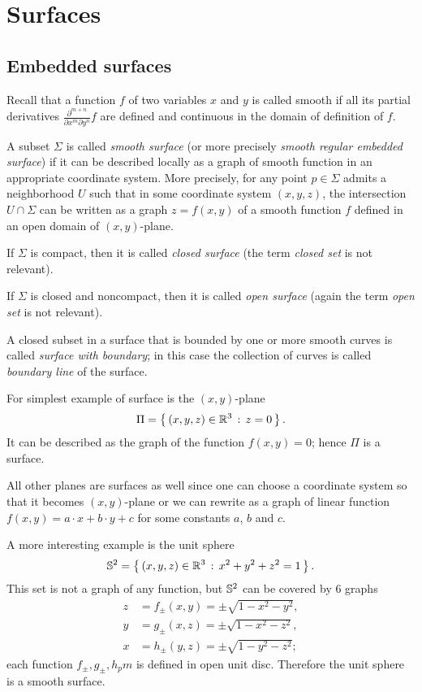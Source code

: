 \chapter{Surfaces}

\section{Embedded surfaces}

Recall that a function $f$ of two variables $x$ and $y$ is called smooth if all its partial derivatives $\frac{\partial^{m+n}}{\partial x^m\partial y^n}f$ are defined and continuous in the domain of definition of $f$. 

A subset $\Sigma$ is called \emph{smooth surface} (or more precisely \emph{smooth regular embedded surface}) if it can be described locally as a graph of smooth function in an appropriate coordinate system.
More precisely, for any point $p\in \Sigma$ admits a neighborhood $U$ such that
in some coordinate system $(x,y,z)$, 
the intersection $U\cap \Sigma$ can be written as a graph $z=f(x,y)$ of a smooth function $f$ defined in an open domain of $(x,y)$-plane.

If $\Sigma$ is compact, then it is called \emph{closed surface} (the term \emph{closed set} is not relevant).

If $\Sigma$ is closed and noncompact, then it is called  \emph{open surface} (again the term \emph{open set} is not relevant).

A closed subset in a surface that is bounded by one or more smooth curves is called \emph{surface with boundary}; in this case the collection of curves is called \emph{boundary line} of the surface.

For simplest example of surface is the $(x,y)$-plane 
\[\Pi=\left\{\,{(x,y,z)\in\mathbb{R}^3}\,:\,{z=0}\,\right\}.\]
It can be described as the graph of the function $f(x,y)=0$; hence $\Pi$ is a surface.

All other planes are surfaces as well since one can choose a coordinate system so that it becomes $(x,y)$-plane or we can rewrite as a graph of linear function 
$f(x,y)=a\cdot x+b\cdot y+c$ for some constants $a$, $b$ and $c$.

A more interesting example is the unit sphere 
\[\mathbb{S}^2=\left\{\,{(x,y,z)\in\mathbb{R}^3}\,:\,{x^2+y^2+z^2=1}\,\right\}.\]
This set is not a graph of any function,
but $\mathbb{S}^2$
can be covered by 6 graphs 
\begin{align*}
z&=f_\pm(x,y)=\pm \sqrt{1-x^2-y^2},
\\
y&=g_\pm(x,z)=\pm \sqrt{1-x^2-z^2},
\\
x&=h_\pm(y,z)=\pm \sqrt{1-y^2-z^2};
\end{align*}
each function $f_\pm,g_\pm,h_pm$ is defined in open unit disc.
Therefore the unit sphere is a smooth surface.

